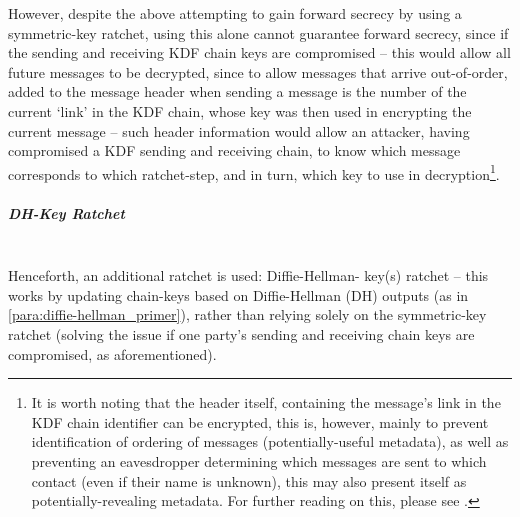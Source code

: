 However, despite the above attempting to gain forward secrecy by using a symmetric-key ratchet, using this alone cannot guarantee forward secrecy, since if the sending and receiving KDF chain keys are compromised -- this would allow all future messages to be decrypted, since to allow messages that arrive out-of-order, added to the message header when sending a message is the number of the current `link' in the KDF chain, whose key was then used in encrypting the current message -- such header information would allow an attacker, having compromised a KDF sending and receiving chain, to know which message corresponds to which ratchet-step, and in turn, which key to use in decryption\footnote{It is worth noting that the header itself, containing the message's link in the KDF chain identifier can be encrypted, this is, however, mainly to prevent identification of ordering of messages (potentially-useful metadata), as well as preventing an eavesdropper determining which messages are sent to which contact (even if their name is unknown), this may also present itself as potentially-revealing metadata. For further reading on this, please see \citep{signal:double_ratchet}.}.
\subparagraph{DH-Key Ratchet}
\label{subpara:dh-key_ratchet}
\noindent\\
Henceforth, an additional ratchet is used: Diffie-Hellman- key(s) ratchet -- this works by updating chain-keys based on Diffie-Hellman (DH) outputs (as in \cref{para:diffie-hellman_primer}), rather than relying solely on the symmetric-key ratchet (solving the issue if one party's sending and receiving chain keys are compromised, as aforementioned).\\
